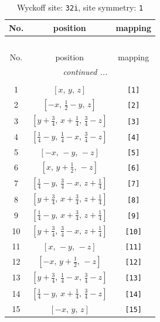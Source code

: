 \documentclass[fleqn,8pt]{jsarticle}
\begin{document}
\renewcommand{\arraystretch}{1.2}
\begin{longtable}{ccc}
\caption{Wyckoff site: {\tt 32i}, site symmetry: {\tt 1}}
 \\
 \hline \hline
No. & position & mapping \\ \hline \endfirsthead

\multicolumn{2}{l}{\tablename\ \thetable{}} \\
 \hline \hline
No. & position & mapping \\ \hline \endhead

 \hline \hline
\multicolumn{2}{r}{\footnotesize\it continued ...} \\ \endfoot

 \hline \hline
\multicolumn{2}{r}{} \\ \endlastfoot

1 & $\left[ x,\, y,\, z \right]$ & {\tt [1]} \\ \hline
2 & $\left[ - x,\, \frac{1}{2} - y,\, z \right]$ & {\tt [2]} \\ \hline
3 & $\left[ y + \frac{3}{4},\, x + \frac{1}{4},\, \frac{3}{4} - z \right]$ & {\tt [3]} \\ \hline
4 & $\left[ \frac{1}{4} - y,\, \frac{1}{4} - x,\, \frac{3}{4} - z \right]$ & {\tt [4]} \\ \hline
5 & $\left[ - x,\, - y,\, - z \right]$ & {\tt [5]} \\ \hline
6 & $\left[ x,\, y + \frac{1}{2},\, - z \right]$ & {\tt [6]} \\ \hline
7 & $\left[ \frac{1}{4} - y,\, \frac{3}{4} - x,\, z + \frac{1}{4} \right]$ & {\tt [7]} \\ \hline
8 & $\left[ y + \frac{3}{4},\, x + \frac{3}{4},\, z + \frac{1}{4} \right]$ & {\tt [8]} \\ \hline
9 & $\left[ \frac{1}{4} - y,\, x + \frac{3}{4},\, z + \frac{1}{4} \right]$ & {\tt [9]} \\ \hline
10 & $\left[ y + \frac{3}{4},\, \frac{3}{4} - x,\, z + \frac{1}{4} \right]$ & {\tt [10]} \\ \hline
11 & $\left[ x,\, - y,\, - z \right]$ & {\tt [11]} \\ \hline
12 & $\left[ - x,\, y + \frac{1}{2},\, - z \right]$ & {\tt [12]} \\ \hline
13 & $\left[ y + \frac{3}{4},\, \frac{1}{4} - x,\, \frac{3}{4} - z \right]$ & {\tt [13]} \\ \hline
14 & $\left[ \frac{1}{4} - y,\, x + \frac{1}{4},\, \frac{3}{4} - z \right]$ & {\tt [14]} \\ \hline
15 & $\left[ - x,\, y,\, z \right]$ & {\tt [15]} \\ \hline

\end{longtable}
\end{document}
